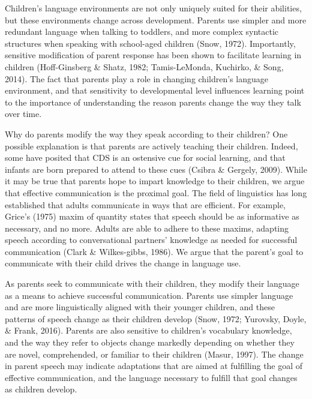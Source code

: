 \documentclass[10pt, letterpaper]{article}
\begin{document}
Children's language environments are not only uniquely suited for their
abilities, but these environments change across development. Parents use
simpler and more redundant language when talking to toddlers, and more
complex syntactic structures when speaking with school-aged children
(Snow, 1972). Importantly, sensitive modification of parent response has
been shown to facilitate learning in children (Hoff-Ginsberg \& Shatz,
1982; Tamis-LeMonda, Kuchirko, \& Song, 2014). The fact that parents
play a role in changing children's language environment, and that
sensitivity to developmental level influences learning point to the
importance of understanding the reason parents change the way they talk
over time.

Why do parents modify the way they speak according to their children?
One possible explanation is that parents are actively teaching their
children. Indeed, some have posited that CDS is an ostensive cue for
social learning, and that infants are born prepared to attend to these
cues (Csibra \& Gergely, 2009). While it may be true that parents hope
to impart knowledge to their children, we argue that effective
communication is the proximal goal. The field of linguistics has long
established that adults communicate in ways that are efficient. For
example, Grice's (1975) maxim of quantity states that speech should be
as informative as necessary, and no more. Adults are able to adhere to
these maxims, adapting speech according to conversational partners'
knowledge as needed for successful communication (Clark \& Wilkes-gibbs,
1986). We argue that the parent's goal to communicate with their child
drives the change in language use.

As parents seek to communicate with their children, they modify their
language as a means to achieve successful communication. Parents use
simpler language and are more linguistically aligned with their younger
children, and these patterns of speech change as their children develop
(Snow, 1972; Yurovsky, Doyle, \& Frank, 2016). Parents are also
sensitive to children's vocabulary knowledge, and the way they refer to
objects change markedly depending on whether they are novel,
comprehended, or familiar to their children (Masur, 1997). The change in
parent speech may indicate adaptations that are aimed at fulfilling the
goal of effective communication, and the language necessary to fulfill
that goal changes as children develop.
\end{document}
